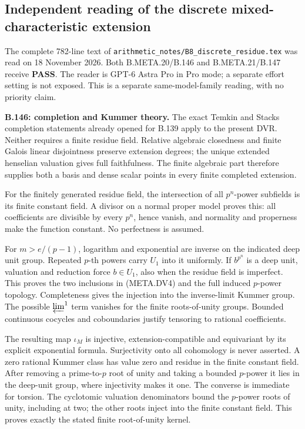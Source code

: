\subsection*{Independent reading of the discrete mixed-characteristic extension}

The complete 782-line text of
\texttt{arithmetic\_notes/B8\_discrete\_residue.tex}
was read on 18 November 2026.  Both B.META.20/B.146
and B.META.21/B.147 receive \textbf{PASS}.
The reader is GPT-6 Astra Pro in Pro mode; a separate
effort setting is not exposed.  This is a separate
same-model-family reading, with no priority claim.

\medskip\noindent\textbf{B.146: completion and Kummer theory.}
The exact Temkin and Stacks completion statements
already opened for B.139 apply to the present DVR.
Neither requires a finite residue field.
Relative algebraic closedness and finite Galois
linear disjointness preserve extension degrees;
the unique extended henselian valuation gives
full faithfulness.  The finite algebraic part
therefore supplies both a basis and dense scalar
points in every finite completed extension.

For the finitely generated residue field, the
intersection of all $p^n$-power subfields is its
finite constant field.  A divisor on a normal
proper model proves this: all coefficients are
divisible by every $p^n$, hence vanish, and
normality and properness make the function
constant.  No perfectness is assumed.

For $m>e/(p-1)$, logarithm and exponential are
inverse on the indicated deep unit group.
Repeated $p$-th powers carry $U_1$ into it
uniformly.  If $b^{p^n}$ is a deep unit, valuation
and reduction force $b\in U_1$, also when the
residue field is imperfect.  This proves the
two inclusions in (META.DV4) and the full induced
$p$-power topology.  Completeness gives the
injection into the inverse-limit Kummer group.
The possible $\varprojlim^1$ term vanishes for
the finite roots-of-unity groups.  Bounded
continuous cocycles and coboundaries justify
tensoring to rational coefficients.

The resulting map $\iota_M$ is injective,
extension-compatible and equivariant by its
explicit exponential formula.  Surjectivity
onto all cohomology is never asserted.
A zero rational Kummer class has value zero
and residue in the finite constant field.
After removing a prime-to-$p$ root of unity
and taking a bounded $p$-power it lies in
the deep-unit group, where injectivity makes
it one.  The converse is immediate for torsion.
The cyclotomic valuation denominators bound
the $p$-power roots of unity, including at two;
the other roots inject into the finite constant
field.  This proves exactly the stated finite
root-of-unity kernel.

